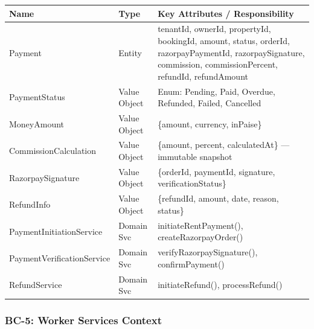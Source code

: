 \documentclass[12pt,a4paper]{article}
\begin{document}
\begin{center}
\begin{tabular}{@{}p{3.5cm}p{2cm}p{8.5cm}@{}}
\toprule
\textbf{Name} & \textbf{Type} & \textbf{Key Attributes / Responsibility} \\
\midrule
Payment & Entity & tenantId, ownerId, propertyId, bookingId, amount, status, orderId, razorpayPaymentId, razorpaySignature, commission, commissionPercent, refundId, refundAmount \\
PaymentStatus & Value Object & Enum: Pending, Paid, Overdue, Refunded, Failed, Cancelled \\
MoneyAmount & Value Object & \{amount, currency, inPaise\} \\
CommissionCalculation & Value Object & \{amount, percent, calculatedAt\} — immutable snapshot \\
RazorpaySignature & Value Object & \{orderId, paymentId, signature, verificationStatus\} \\
RefundInfo & Value Object & \{refundId, amount, date, reason, status\} \\
PaymentInitiationService & Domain Svc & initiateRentPayment(), createRazorpayOrder() \\
PaymentVerificationService & Domain Svc & verifyRazorpaySignature(), confirmPayment() \\
RefundService & Domain Svc & initiateRefund(), processRefund() \\
\bottomrule
\end{tabular}
\end{center}

\subsubsection{BC-5: Worker Services Context}
\end{document}
